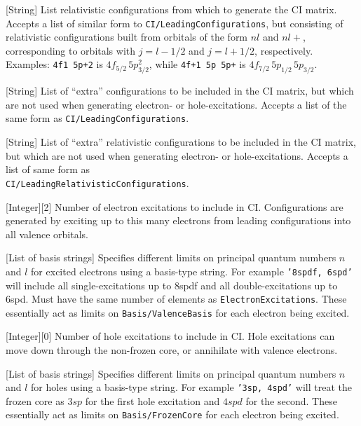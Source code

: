 \documentclass{report}
\begin{document}
[String]{%
List relativistic configurations from which to generate the CI matrix. Accepts a list of similar form
to \texttt{CI/LeadingConfigurations}, but consisting of relativistic configurations built from orbitals
of the form $nl$ and $nl+$, corresponding to orbitals with $j = l - 1/2$ and $j = l + 1/2$, respectively. Examples: \texttt{4f1 5p+2} is $4f_{5/2}\,5p_{3/2}^2$, while \texttt{4f+1 5p 5p+} is $4f_{7/2}\,5p_{1/2}\,5p_{3/2}$.%
}

[String]{%
List of ``extra'' configurations to be included in the CI matrix, but which are not used when generating
electron- or hole-excitations. Accepts a list of the same form as \texttt{CI/LeadingConfigurations}.%
}

[String]{%
List of ``extra'' relativistic configurations to be included in the CI matrix, but which are not used
when generating electron- or hole-excitations. Accepts a list of same form as \\
\texttt{CI/LeadingRelativisticConfigurations}.%
}

[Integer][2]{%
Number of electron excitations to include in CI. Configurations are generated by exciting up to this many electrons from leading configurations into all valence orbitals.%
}

[List of basis strings]{%
Specifies different limits on principal quantum numbers $n$ and $l$ for excited electrons using a basis-type string. For example \texttt{'8spdf, 6spd'} will include all single-excitations up to 8spdf and all double-excitations up to 6spd. Must have the same number of elements as \texttt{ElectronExcitations}. These essentially act as limits on \texttt{Basis/ValenceBasis} for each electron being excited.%
}

[Integer][0]{%
Number of hole excitations to include in CI. Hole excitations can move down through the non-frozen core, or annihilate with valence electrons.%
}

[List of basis strings]{%
Specifies different limits on principal quantum numbers $n$ and $l$ for holes using a basis-type string. For example \texttt{'3sp, 4spd'} will treat the frozen core as $3sp$ for the first hole excitation and $4spd$ for the second. These essentially act as limits on \texttt{Basis/FrozenCore} for each electron being excited.%
}
\end{document}
